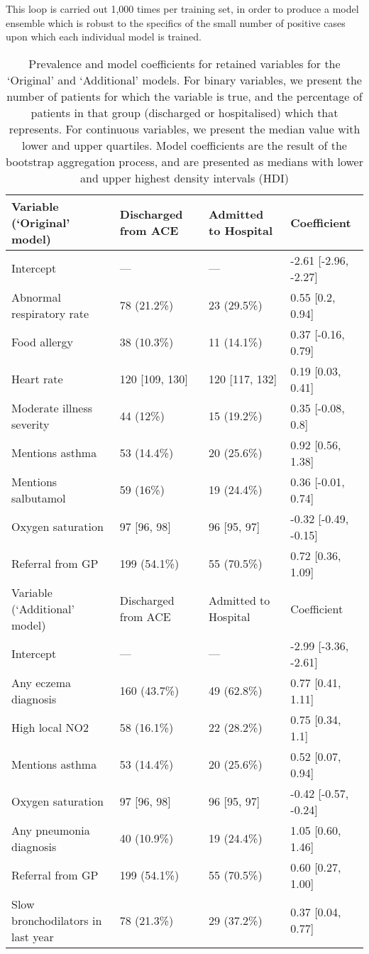 This loop is carried out 1,000 times per training set, in order to produce a model ensemble which is robust to the specifics of the small number of positive cases upon which each individual model is trained.

\begin{table}[h]
\centering
\caption[Prevalence and model coefficients for retained variables.]{Prevalence and model coefficients for retained variables for the `Original' and `Additional' models. For binary variables, we present the number of patients for which the variable is true, and the percentage of patients in that group (discharged or hospitalised) which that represents. For continuous variables, we present the median value with lower and upper quartiles. Model coefficients are the result of the bootstrap aggregation process, and are presented as medians with lower and upper highest density intervals (HDI)}
\begin{tabular}{P{5cm}P{2.5cm}P{2.5cm}l}
  \hline
Variable (`Original' model) & Discharged from ACE & Admitted to Hospital & Coefficient \\ 
  \hline
Intercept & --- & --- & -2.61 [-2.96, -2.27] \\ 
  Abnormal respiratory rate & 78 (21.2\%) & 23 (29.5\%) & 0.55 [0.2, 0.94] \\ 
  Food allergy & 38 (10.3\%) & 11 (14.1\%) & 0.37 [-0.16, 0.79] \\ 
  Heart rate & 120 [109, 130] & 120 [117, 132] & 0.19 [0.03, 0.41] \\ 
  Moderate illness severity & 44 (12\%) & 15 (19.2\%) & 0.35 [-0.08, 0.8] \\ 
  Mentions asthma & 53 (14.4\%) & 20 (25.6\%) & 0.92 [0.56, 1.38] \\ 
  Mentions salbutamol & 59 (16\%) & 19 (24.4\%) & 0.36 [-0.01, 0.74] \\ 
  Oxygen saturation & 97 [96, 98] & 96 [95, 97] & -0.32 [-0.49, -0.15] \\ 
  Referral from GP & 199 (54.1\%) & 55 (70.5\%) & 0.72 [0.36, 1.09] \\ 
  \hline
Variable (`Additional' model) & Discharged from ACE & Admitted to Hospital & Coefficient \\ 
  \hline
  Intercept & --- & ---& -2.99 [-3.36, -2.61] \\
  Any eczema diagnosis & 160 (43.7\%) & 49 (62.8\%) & 0.77 [0.41, 1.11] \\ 
  High local NO2 & 58 (16.1\%) & 22 (28.2\%) & 0.75 [0.34, 1.1] \\ 
  Mentions asthma & 53 (14.4\%) & 20 (25.6\%) & 0.52 [0.07, 0.94] \\ 
  Oxygen saturation & 97 [96, 98] & 96 [95, 97] & -0.42 [-0.57, -0.24] \\ 
  Any pneumonia diagnosis & 40 (10.9\%) & 19 (24.4\%) & 1.05 [0.60, 1.46] \\ 
  Referral from GP & 199 (54.1\%) & 55 (70.5\%) & 0.60 [0.27, 1.00] \\ 
  Slow bronchodilators in last year & 78 (21.3\%) & 29 (37.2\%) & 0.37 [0.04, 0.77] \\ 
   \hline
\end{tabular}
\end{table}

